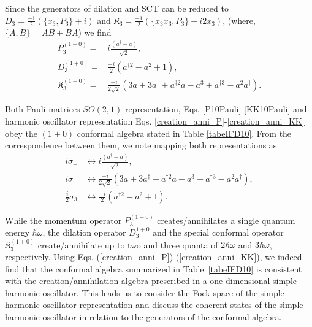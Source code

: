 \documentclass[%
 reprint,
superscriptaddress,
 amsmath,amssymb,
 aps,
]{revtex4-2}
\begin{document}
Since the generators of dilation and SCT can be reduced to $D_{3}=\frac{-1}{2}\left(\{x_{3}, P_{3}\}+i\right)$ and $\mathfrak{K}_{{3}}=\frac{-1}{2}\left(\{x_{3}x_{3}, P_{3}\}+i2x_{3}\right)$, (where, $\{A,B\}=AB+BA$) we find
\begin{align}
    P^{(1+0)}_{3}=&i\frac{(a^{\dagger}-a)}{\sqrt{2}}\label{creation_anni_P},\\
    D^{(1+0)}_{3}=&\frac{-i}{2}\left(a^{\dagger 2} - a^2+1\right)\label{creation_anni_D},\\
    \mathfrak{K}^{(1+0)}_{{3}}=&\frac{-i}{2\sqrt{2}}\left(3a+3a^{\dagger}+  a^{\dagger 2}a - a^3 +  a^{\dagger 3} - a^2 a^{\dagger}\right)\label{creation_anni_KK}.
\end{align}

Both Pauli matrices $SO(2,1)$ representation, Eqs. \eqref{P10Pauli}-\eqref{KK10Pauli} and harmonic oscillator representation Eqs. \eqref{creation_anni_P}-\eqref{creation_anni_KK} obey the $(1+0)$ conformal algebra stated in Table \ref{tabeIFD10}. From the correspondence between them, we note mapping both representations as
\begin{align}
    i\sigma_{-}&\leftrightarrow i\frac{(a^{\dagger}-a)}{\sqrt{2}},\\
    i\sigma_{+}&\leftrightarrow \frac{-i}{2\sqrt{2}}\left(3a+3a^{\dagger}+  a^{\dagger 2}a - a^3 +  a^{\dagger 3} - a^2 a^{\dagger}\right),\\
    \frac{i}{2}\sigma_{3}&\leftrightarrow \frac{-i}{2}\left(a^{\dagger 2} - a^2+1\right).
\end{align} 

While the momentum operator $P_3^{(1+0)}$ creates/annihilates a single quantum energy $\hbar \omega$, the dilation operator $D_3^{1+0}$ and the special conformal operator $\mathfrak{K}_{{3}}^{(1+0)}$ create/annihilate up to two and three quanta of $2\hbar\omega$ and $3\hbar\omega$, respectively. 
Using Eqs. (\ref{creation_anni_P})-(\ref{creation_anni_KK}), we indeed find that 
the conformal algebra summarized in Table~\ref{tabeIFD10} is consistent with the creation/annihilation algebra prescribed in a one-dimensional simple harmonic oscillator. This leads us to consider the Fock space of the simple harmonic oscillator representation and discuss the coherent states of the simple harmonic oscillator in relation to the generators of the conformal algebra. 
\end{document}
